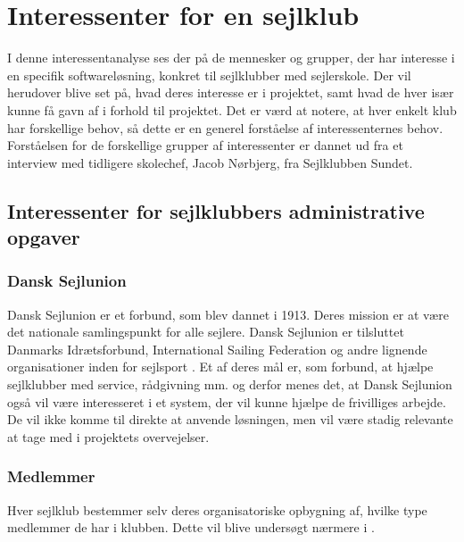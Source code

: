 \chapter{Interessenter for en sejlklub}\label{chap:interessent-analyse-ved-sejlklubber}

I denne interessentanalyse ses der på de mennesker og grupper, der har interesse i en specifik softwareløsning, konkret til sejlklubber med sejlerskole.
Der vil herudover blive set på, hvad deres interesse er i projektet, samt hvad de hver især kunne få gavn af i forhold til projektet.
Det er værd at notere, at hver enkelt klub har forskellige behov, så dette er en generel forståelse af interessenternes behov.
Forståelsen for de forskellige grupper af interessenter er dannet ud fra et interview med tidligere skolechef, Jacob Nørbjerg, fra Sejlklubben Sundet. 


\section{Interessenter for sejlklubbers administrative opgaver}


\subsection{Dansk Sejlunion}

Dansk Sejlunion er et forbund, som blev dannet i 1913. Deres mission er at være det nationale samlingspunkt for alle sejlere. 
Dansk Sejlunion er tilsluttet Danmarks Idrætsforbund, International Sailing Federation og andre lignende organisationer inden for sejlsport \citep{Sejlsportdk}.
Et af deres mål er, som forbund, at hjælpe sejlklubber med service, rådgivning mm. og derfor menes det, at Dansk Sejlunion også vil være interesseret i et system, der vil kunne hjælpe de frivilliges arbejde. 
De vil ikke komme til direkte at anvende løsningen, men vil være stadig relevante at tage med i projektets overvejelser. 


\subsection{Medlemmer}\label{subsec:interessent-medlemmer}

Hver sejlklub bestemmer selv deres organisatoriske opbygning af, hvilke type medlemmer de har i klubben.
Dette vil blive undersøgt nærmere i . 

